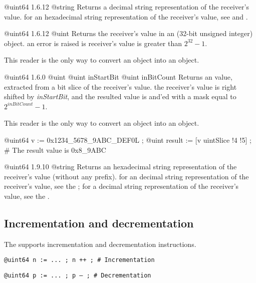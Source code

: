 {@uint64}
{1.6.12}
{@string}
{Returns a decimal string representation of the receiver's value.}
{for an hexadecimal string representation of the receiver's value, see  and .}



{@uint64}
{1.6.12}
{@uint}
{Returns the receiver's value in an  (32-bit unsigned integer) object.}
{an error is raised is receiver's value is greater than $2^{32}-1$.}

This reader is the only way to convert an  object into an  object.


{@uint64}
{1.6.0}
{@uint}
{@uint inStartBit}
{@uint inBitCount}
{Returns an  value, extracted from a bit slice of the receiver's value.}
{the receiver's value is right shifted by \emph{inStartBit}, and the resulted value is and'ed with a mask equal to $2^{inBitCount}-1$.}

This reader is the only way to convert an  object into an  object.


\exempleDeuxLignes
{}
{@uint64 v := 0x1234\_5678\_9ABC\_DEF0L ;}
{@uint result := [v uintSlice !4 !5] ; \# The result value is 0x8\_9ABC}




{@uint64}
{1.9.10}
{@string}
{Returns an hexadecimal string representation of the receiver's value (without any prefix).}
{for an decimal string representation of the receiver's value, see the ; for a decimal string representation of the receiver's value, see the .}






\subsection{Incrementation and decrementation}

The  supports incrementation and decrementation instructions.

\texttt{@uint64 n := ... ; n ++ ; \# Incrementation}

\texttt{@uint64 p := ... ; p -- ; \# Decrementation}\newline

